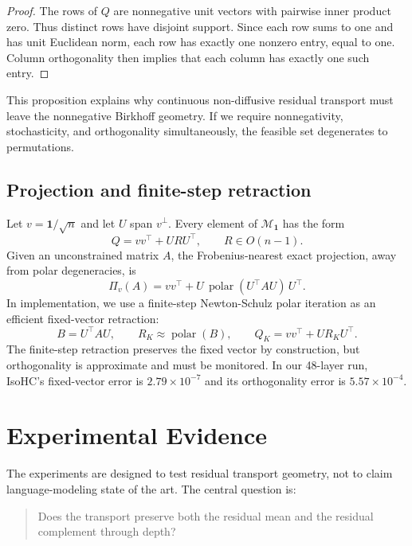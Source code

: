 \documentclass[10pt]{article}
\newcommand{\one}{\mathbf{1}}
\newcommand{\Mone}{\mathcal{M}_{\one}}
\DeclareMathOperator{\polar}{polar}
\begin{document}
\begin{proof}
The rows of $Q$ are nonnegative unit vectors with pairwise inner product zero.
Thus distinct rows have disjoint support.  Since each row sums to one and has
unit Euclidean norm, each row has exactly one nonzero entry, equal to one.
Column orthogonality then implies that each column has exactly one such entry.
\end{proof}

This proposition explains why continuous non-diffusive residual transport must
leave the nonnegative Birkhoff geometry.  If we require nonnegativity,
stochasticity, and orthogonality simultaneously, the feasible set degenerates to
permutations.

\subsection{Projection and finite-step retraction}

Let $v=\one/\sqrt{n}$ and let $U$ span $v^\perp$.  Every element of $\Mone$ has
the form
\begin{equation}
    Q = vv^\top + U R U^\top,\qquad R\in O(n-1).
\end{equation}
Given an unconstrained matrix $A$, the Frobenius-nearest exact projection, away
from polar degeneracies, is
\begin{equation}
    \Pi_v(A)=vv^\top + U\,\polar(U^\top A U)\,U^\top.
\end{equation}
In implementation, we use a finite-step Newton-Schulz polar iteration as an
efficient fixed-vector retraction:
\begin{equation}
    B=U^\top A U,\qquad R_K\approx \polar(B),\qquad Q_K=vv^\top+UR_KU^\top.
\end{equation}
The finite-step retraction preserves the fixed vector by construction, but
orthogonality is approximate and must be monitored.  In our 48-layer run,
IsoHC's fixed-vector error is $2.79\times10^{-7}$ and its orthogonality error is
$5.57\times10^{-4}$.

\section{Experimental Evidence}

The experiments are designed to test residual transport geometry, not to claim
language-modeling state of the art.  The central question is:
\begin{quote}
Does the transport preserve both the residual mean and the residual complement
through depth?
\end{quote}
\end{document}
